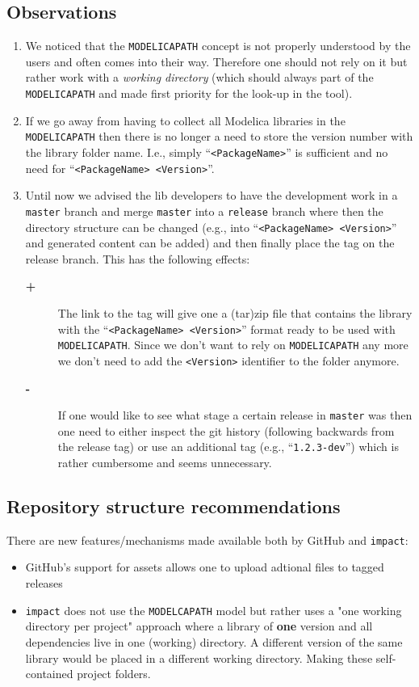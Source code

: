 \documentclass[11pt,a4paper,twocolumn]{article}
\newcommand{\code}[1]{\texttt{#1}} %
\begin{document}
\subsection{Observations}
\begin{enumerate}
\item  We noticed that the \texttt{MODELICAPATH} concept is not properly
  understood  by the users and often comes into their way.
Therefore one should not rely on it but rather work with a
\emph{working directory} (which should always part of the
\texttt{MODELICAPATH} and made first priority for the look-up in the
tool).
\item  If we go away from having to collect all Modelica libraries
in the \texttt{MODELICAPATH}  then there is no longer a need to store the
  version number with the library folder name.
I.e., simply ``\texttt{<PackageName>}'' is sufficient and no need for
``\texttt{<PackageName>~<Version>}''.
\item  Until now we advised the lib developers to have the development
  work in a \texttt{master} branch and merge \texttt{master} into a
  \texttt{release} branch where then the directory structure can be
  changed (e.g., into ``\texttt{<PackageName> <Version>}'' and
  generated content can be added) and then finally place the tag on
  the release branch. This has the following effects:
  \begin{description}
  \item[\textbf{+}] The link to the tag will give one a (tar)zip file
    that contains the library with the
    ``\texttt{<PackageName>~<Version>}'' format ready to be used with
    \texttt{MODELICAPATH}. Since we don't want to rely on
    \texttt{MODELICAPATH} any more we don't need to add the
    \texttt{<Version>} identifier to the folder anymore.
  \item[\textbf{-}] If one would like to see what stage a certain
    release in \texttt{master} was then one need to either inspect the
    git history (following backwards from the release tag) or use an
    additional tag (e.g., ``\texttt{1.2.3-dev}'') which is rather
    cumbersome and seems unnecessary.
  \end{description}
\end{enumerate}

\subsection{Repository structure recommendations}
There are new features/mechanisms made available both by GitHub and
\code{impact}:
\begin{itemize}
\item GitHub's support for assets \parencite{gh-assets} allows one to
  upload adtional files to tagged releases
\item  \code{impact} does not use the \texttt{MODELCAPATH} model but
  rather uses a "one working directory per project" approach where a
  library of \textbf{one} version  and all dependencies live in one
  (working) directory. A different version of the same library would
  be placed in a different working directory.
  Making these self-contained project folders.
\end{itemize}
\end{document}
